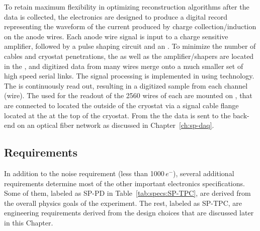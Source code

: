 To retain maximum flexibility in optimizing reconstruction algorithms after 
the  data is collected, the  electronics are designed 
to produce a digital record representing the waveform of the current produced 
by charge collection/induction on the anode wires.  Each anode wire signal is 
input to a charge sensitive amplifier, followed by a pulse shaping circuit and 
an .  To minimize the number of cables and cryostat penetrations, 
the  as well as the amplifier/shapers are located in the , 
and digitized data from many wires merge onto a much smaller set of high speed 
serial links. The  signal processing is implemented in 
using  technology.  The  is continuously 
read out, resulting in a digitized  sample from each  
channel (wire). The  used for the readout of the \num{2560}
wires of each  are mounted on , that are connected to
 located the outside of the cryostat via a  signal 
cable flange located at the  \fdth at the top of the cryostat.
From the  the data is sent to the  back-end on
an optical fiber network as discussed in Chapter~\ref{ch:sp-daq}.

\subsection{Requirements}
\label{sec:fdsp-tpcelec-overview-requirements}

In addition to the noise requirement (less than \num{1000}\,$e^{-}$), several 
additional requirements determine most of the other important  
electronics specifications. Some of them, labeled as SP-PD in Table~\ref{tab:specs:SP-TPC},
are derived from the overall physics goals of the experiment. The rest, labeled
as SP-TPC, are engineering requirements derived from the design choices that
are discussed later in this Chapter.





